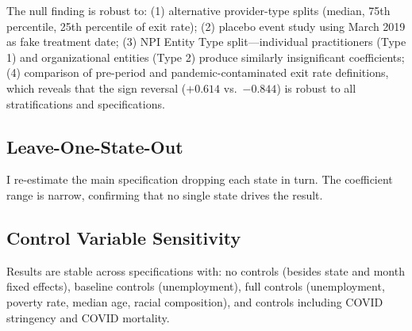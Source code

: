 \documentclass[12pt]{article}
\begin{document}
The null finding is robust to: (1) alternative provider-type splits (median, 75th percentile, 25th percentile of exit rate); (2) placebo event study using March 2019 as fake treatment date; (3) NPI Entity Type split---individual practitioners (Type 1) and organizational entities (Type 2) produce similarly insignificant coefficients; (4) comparison of pre-period and pandemic-contaminated exit rate definitions, which reveals that the sign reversal ($+0.614$ vs.\ $-0.844$) is robust to all stratifications and specifications.

\subsection{Leave-One-State-Out}

I re-estimate the main specification dropping each state in turn. The coefficient range is narrow, confirming that no single state drives the result.

\subsection{Control Variable Sensitivity}

Results are stable across specifications with: no controls (besides state and month fixed effects), baseline controls (unemployment), full controls (unemployment, poverty rate, median age, racial composition), and controls including COVID stringency and COVID mortality.
\end{document}
